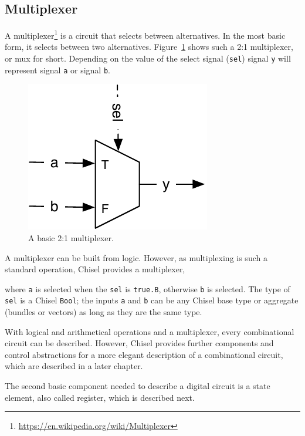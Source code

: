 \documentclass[%
    10pt,
    headinclude, footexclude,
    openright, %
    notitlepage,
    cleardoubleempty,
    headsepline,
    pointlessnumbers,
    bibtotoc, idxtotoc,
    ]{scrbook}
\newcommand{\code}[1]{{\small{\texttt{#1}}}}
\newcommand{\scale}{0.7}
\newcommand{\myref}[2]{\href{#1}{#2}}
\renewcommand{\myref}[2]{{#2}{\footnote{\url{#1}}}}
\begin{document}
\subsection{Multiplexer}


A \myref{https://en.wikipedia.org/wiki/Multiplexer}{multiplexer} is a circuit that selects between alternatives.
In the most basic form, it selects between two alternatives. Figure~\ref{fig:mux} shows
such a 2:1 multiplexer, or mux for short. Depending on the value of the
select signal (\code{sel}) signal \code{y} will represent signal \code{a} or
signal \code{b}.

\begin{figure}
  \centering
  \includegraphics[scale=\scale]{figures/mux}
  \caption{A basic 2:1 multiplexer.}
  \label{fig:mux}
\end{figure}

A multiplexer can be built from logic.
However, as multiplexing  is such a standard operation, Chisel provides a multiplexer,


\noindent where \code{a} is selected when the \code{sel} is \code{true.B}, otherwise \code{b}
is selected. The type of \code{sel} is a Chisel \code{Bool}; the inputs \code{a} and \code{b}
can be any Chisel base type or aggregate (bundles or vectors) as long as they are the same
type.

With logical and arithmetical operations and a multiplexer, every combinational
circuit can be described. However, Chisel provides further components and control abstractions
for a more elegant description of a combinational circuit, which are described in
a later chapter.

The second basic component needed to describe a digital circuit is a state element,
also called register, which is described next.
\end{document}
